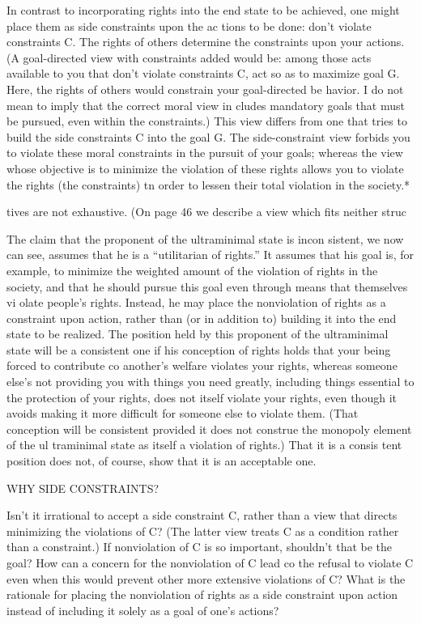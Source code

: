 \documentclass[11pt,openany]{book}
\begin{document}
In contrast to incorporating rights into the end state to be achieved, one might place them as side constraints upon the ac tions to be done: don't violate constraints C. The rights of others determine the constraints upon your actions. (A goal-directed view with constraints added would be: among those acts available to you that don't violate constraints C, act so as to maximize goal G. Here, the rights of others would constrain your goal-directed be havior. I do not mean to imply that the correct moral view in cludes mandatory goals that must be pursued, even within the constraints.) This view differs from one that tries to build the side constraints C into the goal G. The side-constraint view forbids you to violate these moral constraints in the pursuit of your goals; whereas the view whose objective is to minimize the violation of these rights allows you to violate the rights (the constraints) tn order to lessen their total violation in the society.* 

tives are not exhaustive. (On page 46 we describe a view which fits neither struc

The claim that the proponent of the ultraminimal state is incon sistent, we now can see, assumes that he is a ``utilitarian of rights.'' It assumes that his goal is, for example, to minimize the weighted amount of the violation of rights in the society, and that he should pursue this goal even through means that themselves vi olate people's rights. Instead, he may place the nonviolation of rights as a constraint upon action, rather than (or in addition to) building it into the end state to be realized. The position held by this proponent of the ultraminimal state will be a consistent one if his conception of rights holds that your being forced to contribute co another's welfare violates your rights, whereas someone else's not providing you with things you need greatly, including things essential to the protection of your rights, does not itself violate your rights, even though it avoids making it more difficult for someone else to violate them. (That conception will be consistent provided it does not construe the monopoly element of the ul traminimal state as itself a violation of rights.) That it is a consis tent position does not, of course, show that it is an acceptable one. 

WHY SIDE CONSTRAINTS? 

Isn't it irrational to accept a side constraint C, rather than a view that directs minimizing the violations of C? (The latter view treats C as a condition rather than a constraint.) If nonviolation of C is so important, shouldn't that be the goal? How can a concern for the nonviolation of C lead co the refusal to violate C even when this would prevent other more extensive violations of C? What is the rationale for placing the nonviolation of rights as a side constraint upon action instead of including it solely as a goal of one's actions? 
\end{document}
